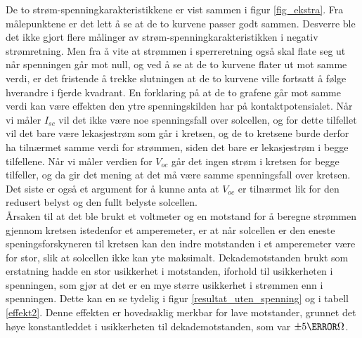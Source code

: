 \documentclass[%
 reprint,
 amsmath,amssymb,
 aps,
 norsk,
 booktabs
]{revtex4-1}
\begin{document}
De to strøm-spenningkarakteristikkene er vist sammen i figur \vref{fig_ekstra}. Fra målepunktene er det lett å se at de to kurvene passer godt sammen. Desverre ble det ikke gjort flere målinger av strøm-spenningkarakteristikken i negativ strømretning. Men fra å vite at strømmen i sperreretning også skal flate seg ut når spenningen går mot null, og ved å se at de to kurvene flater ut mot samme verdi, er det fristende å trekke slutningen at de to kurvene ville fortsatt å følge hverandre i fjerde kvadrant. En forklaring på at de to grafene går mot samme verdi kan være effekten den ytre spenningskilden har på kontaktpotensialet. Når vi måler $I_{sc}$ vil det ikke være noe spenningsfall over solcellen, og for dette tilfellet vil det bare være lekasjestrøm som går i kretsen, og de to kretsene burde derfor ha tilnærmet samme verdi for strømmen, siden det bare er lekasjestrøm i begge tilfellene. Når vi måler verdien for $V_{oc}$ går det ingen strøm i kretsen for begge tilfeller, og da gir det mening at det må være samme spenningsfall over kretsen. Det siste er også et argument for å kunne anta at $V_{oc}$ er tilnærmet lik for den redusert belyst og den fullt belyste solcellen. \\
Årsaken til at det ble brukt et voltmeter og en motstand for å beregne strømmen gjennom kretsen istedenfor et amperemeter, er at når solcellen er den eneste speningsforskyneren til kretsen kan den indre motstanden i et amperemeter være for stor, slik at solcellen ikke kan yte maksimalt. Dekademotstanden brukt som erstatning hadde en stor usikkerhet i motstanden, iforhold til usikkerheten i spenningen, som gjør at det er en mye større usikkerhet i strømmen enn i spenningen. Dette kan en se tydelig i figur \vref{resultat_uten_spenning} og i tabell \vref{effekt2}. Denne effekten er hovedsaklig merkbar for lave motstander, grunnet det høye konstantleddet i usikkerheten til dekademotstanden, som var $\pm5\milli\Omega$.
\end{document}
